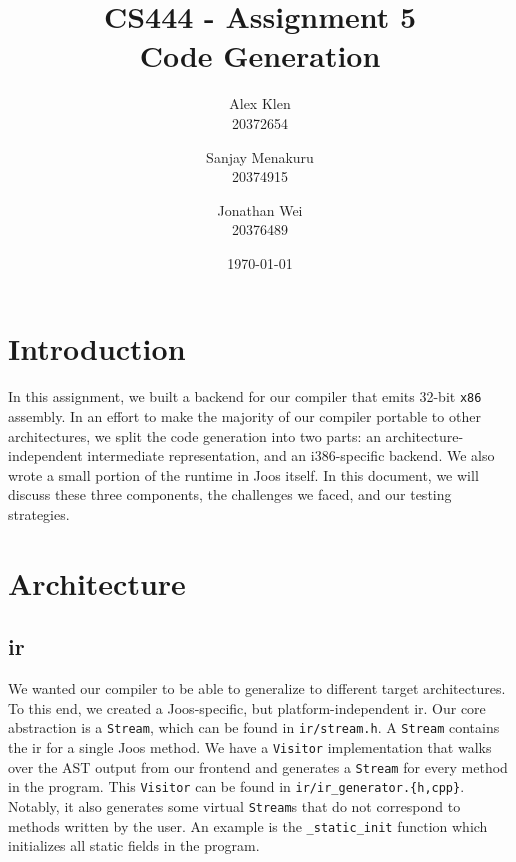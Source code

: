 \documentclass[12pt, titlepage]{article}
\newcommand{\assignmentNumber}{Assignment 5}
\newcommand{\courseName}{CS 444}
\newcommand{\z}[1]{\texttt{#1}}
\begin{document}
\pagestyle{fancyplain}
\thispagestyle{plain}

\fancyhead{}
\fancyfoot{}
\chead{\fancyplain{}{\assignmentNumber}}
\lhead{\fancyplain{}{\courseName}}

\title{CS444 - \assignmentNumber\\Code Generation}
\date{\today}
\author{
  Alex Klen\\20372654 \and
  Sanjay Menakuru\\20374915 \and
  Jonathan Wei\\20376489
}

\maketitle

\section{Introduction}

In this assignment, we built a backend for our compiler that emits 32-bit
\z{x86} assembly. In an effort to make the majority of our compiler portable to
other architectures, we split the code generation into two parts: an
architecture-independent intermediate representation, and an i386-specific
backend. We also wrote a small portion of the runtime in Joos itself. In this
document, we will discuss these three components, the challenges we faced, and
our testing strategies.

\section{Architecture}\label{sec:arch}

\subsection{\ac{ir}}\label{subsec:ir}

We wanted our compiler to be able to generalize to different target
architectures. To this end, we created a Joos-specific, but
platform-independent \ac{ir}. Our core abstraction is a \z{Stream}, which can
be found in \z{ir/stream.h}. A \z{Stream} contains the \ac{ir} for a single
Joos method. We have a \z{Visitor} implementation that walks over the AST
output from our frontend and generates a \z{Stream} for every method in the
program. This \z{Visitor} can be found in \z{ir/ir\_generator.\{h,cpp\}}.
Notably, it also generates some virtual \z{Stream}s that do not correspond to
methods written by the user. An example is the \z{\_static\_init} function
which initializes all static fields in the program. 
\end{document}
